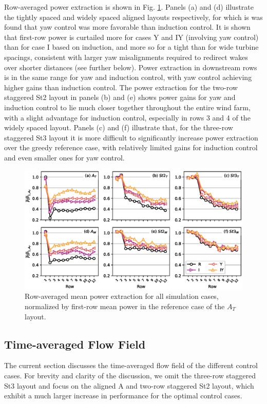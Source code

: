 \documentclass[a4paper]{jpconf}
\begin{document}
Row-averaged power extraction is shown in Fig. \ref{fig:power_row}. Panels (a) and (d) illustrate the tightly spaced and widely spaced aligned layouts respectively, for which is was found that yaw control was more favorable than induction control. It is shown that first-row power is curtailed more for cases Y and IY (involving yaw control) than for case I based on induction, and more so for a tight than for wide turbine spacings, consistent with larger yaw misalignments required to redirect wakes over shorter distances (see further below). Power extraction in downstream rows is in the same range for yaw and induction control, with yaw control achieving higher gains than induction control. The power extraction for the two-row staggered St2 layout in panels (b) and (e) shows power gains for yaw and induction control to lie much closer together throughout the entire wind farm, with a slight advantage for induction control, especially in rows 3 and 4 of the widely spaced layout. Panels (c) and (f) illustrate that, for the three-row staggered St3 layout it is more difficult to significantly increase power extraction over the greedy reference case, with relatively limited gains for induction control and even smaller ones for yaw control. 

\begin{figure}
	\includegraphics[width=\textwidth]{Torque18/power_row}
	\caption{Row-averaged mean power extraction for all simulation cases, normalized by first-row mean power in the reference case of the $A_T$ layout.\label{fig:power_row}}
\end{figure}



\subsection{Time-averaged Flow Field}
The current section discusses the time-averaged flow field of the different control cases. For brevity and clarity of the discussion, we omit the three-row staggered St3 layout and focus on the aligned A and two-row staggered St2 layout, which exhibit a much larger increase in performance for the optimal control cases. 
\end{document}
